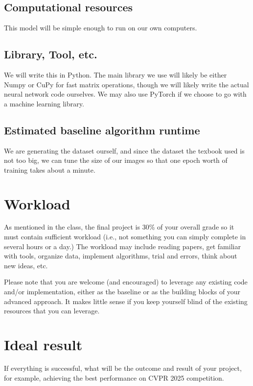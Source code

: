 \documentclass{article}
\begin{document}
\subsection{Computational resources}

This model will be simple enough to run on our own computers.

\subsection{Library, Tool, etc.}
We will write this in Python.  The main library we use will likely be either Numpy or CuPy for fast matrix operations, though we will likely write the actual neural network code ourselves.  We may also use PyTorch if we choose to go with a machine learning library.

\subsection{Estimated baseline algorithm runtime}

We are generating the dataset ourself, and since the dataset the texbook used is not too big, we can tune the size of our images so that one epoch worth of training takes about a minute.

\section{Workload}
{\color{red}
As mentioned in the class, the final project is 30\% of your overall grade so it must contain sufficient workload (i.e., not something you can simply complete in several hours or a day.) The workload may include reading papers, get familiar with tools, organize data, implement algorithms, trial and errors, think about new ideas, etc.

Please note that you are welcome (and encouraged) to leverage any existing code and/or implementation, either as the baseline or as the building blocks of your advanced approach. It makes little sense if you keep yourself blind of the existing resources that you can leverage. 
}


\section{Ideal result}
{\color{red}
If everything is successful, what will be the outcome and result of your project, for example, achieving the best performance on CVPR 2025 competition.
}
\end{document}

